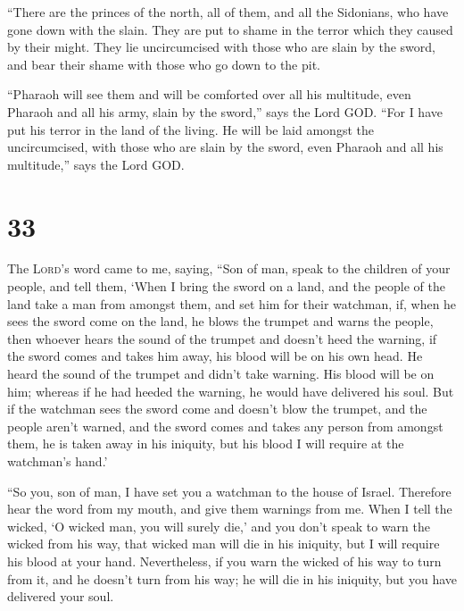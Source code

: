  ``There are the princes of the north, all of them, and
all the Sidonians, who have gone down with the slain. They are put to
shame in the terror which they caused by their might. They lie
uncircumcised with those who are slain by the sword, and bear their
shame with those who go down to the pit.

 ``Pharaoh will see them and will be comforted over all
his multitude, even Pharaoh and all his army, slain by the sword,'' says
the Lord GOD.  ``For I have put his terror in the land of
the living. He will be laid amongst the uncircumcised, with those who
are slain by the sword, even Pharaoh and all his multitude,'' says the
Lord GOD.

\hypertarget{section-32}{%
\section{33}\label{section-32}}

 The \textsc{Lord}'s word came to me, saying,
 ``Son of man, speak to the children of your people, and
tell them, `When I bring the sword on a land, and the people of the land
take a man from amongst them, and set him for their watchman,
 if, when he sees the sword come on the land, he blows the
trumpet and warns the people,  then whoever hears the
sound of the trumpet and doesn't heed the warning, if the sword comes
and takes him away, his blood will be on his own head.  He
heard the sound of the trumpet and didn't take warning. His blood will
be on him; whereas if he had heeded the warning, he would have delivered
his soul.  But if the watchman sees the sword come and
doesn't blow the trumpet, and the people aren't warned, and the sword
comes and takes any person from amongst them, he is taken away in his
iniquity, but his blood I will require at the watchman's hand.'

 ``So you, son of man, I have set you a watchman to the
house of Israel. Therefore hear the word from my mouth, and give them
warnings from me.  When I tell the wicked, `O wicked man,
you will surely die,' and you don't speak to warn the wicked from his
way, that wicked man will die in his iniquity, but I will require his
blood at your hand.  Nevertheless, if you warn the wicked
of his way to turn from it, and he doesn't turn from his way; he will
die in his iniquity, but you have delivered your soul.

